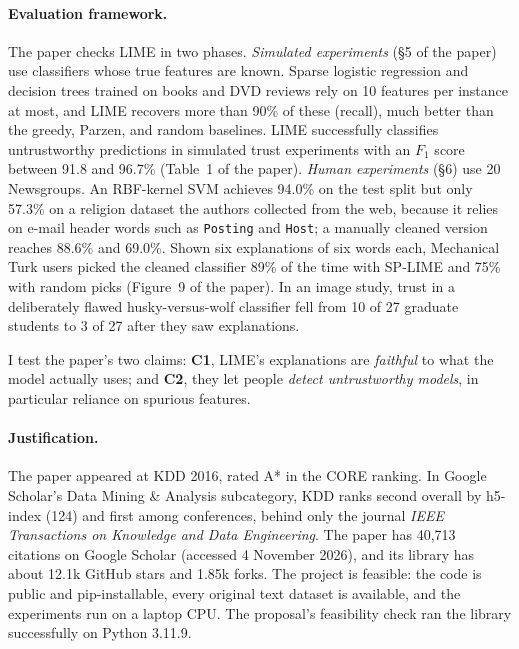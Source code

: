 \documentclass[11pt]{article}
\newcommand{\tok}[1]{\texttt{#1}}
\begin{document}
\paragraph{Evaluation framework.} The paper checks LIME in two phases. \emph{Simulated experiments} (\S5 of the paper) use classifiers whose true features are known. Sparse logistic regression and decision trees trained on books and DVD reviews rely on 10 features per instance at most, and LIME recovers more than 90\% of these (recall), much better than the greedy, Parzen, and random baselines. LIME successfully classifies untrustworthy predictions in simulated trust experiments with an $F_1$ score between 91.8 and 96.7\% (Table~1 of the paper). \emph{Human experiments} (\S6) use 20 Newsgroups. An RBF-kernel SVM achieves 94.0\% on the test split but only 57.3\% on a religion dataset the authors collected from the web, because it relies on e-mail header words such as \tok{Posting} and \tok{Host}; a manually cleaned version reaches 88.6\% and 69.0\%. Shown six explanations of six words each, Mechanical Turk users picked the cleaned classifier 89\% of the time with SP-LIME and 75\% with random picks (Figure~9 of the paper). In an image study, trust in a deliberately flawed husky-versus-wolf classifier fell from 10 of 27 graduate students to 3 of 27 after they saw explanations.

I test the paper's two claims: \textbf{C1}, LIME's explanations are \emph{faithful} to what the model actually uses; and \textbf{C2}, they let people \emph{detect untrustworthy models}, in particular reliance on spurious features.

\paragraph{Justification.} The paper appeared at KDD 2016, rated A* in the CORE ranking. In Google Scholar's Data Mining \& Analysis subcategory, KDD ranks second overall by h5-index (124) and first among conferences, behind only the journal \emph{IEEE Transactions on Knowledge and Data Engineering}. The paper has 40,713 citations on Google Scholar (accessed 4 November 2026), and its library has about 12.1k GitHub stars and 1.85k forks. The project is feasible: the code is public and pip-installable, every original text dataset is available, and the experiments run on a laptop CPU. The proposal's feasibility check ran the library successfully on Python 3.11.9.

\end{document}
